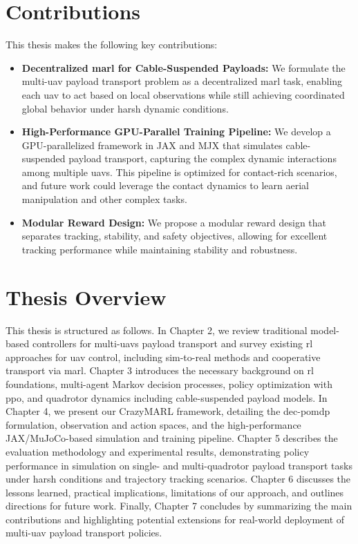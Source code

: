 \section{Contributions}
This thesis makes the following key contributions:
\begin{itemize}
    \item \textbf{Decentralized \gls{marl} for Cable-Suspended Payloads:} We formulate the multi-\gls{uav} payload transport problem as a decentralized \gls{marl} task, enabling each \gls{uav} to act based on local observations while still achieving coordinated global behavior under harsh dynamic conditions.
    \item \textbf{High-Performance GPU-Parallel Training Pipeline:} We develop a GPU-parallelized framework in JAX and MJX that simulates cable-suspended payload transport, capturing the complex dynamic interactions among multiple \glspl{uav}. This pipeline is optimized for contact-rich scenarios, and future work could leverage the contact dynamics to learn aerial manipulation and other complex tasks.
    \item \textbf{Modular Reward Design:} We propose a modular reward design that separates tracking, stability, and safety objectives, allowing for excellent tracking performance while maintaining stability and robustness. 
\end{itemize}

\section{Thesis Overview}
This thesis is structured as follows. In Chapter 2, we review traditional model-based controllers for multi-\glspl{uav} payload transport and survey existing \gls{rl} approaches for \gls{uav} control, including sim-to-real methods and cooperative transport via \gls{marl}. Chapter 3 introduces the necessary background on \gls{rl} foundations, multi-agent Markov decision processes, policy optimization with \gls{ppo}, and quadrotor dynamics including cable-suspended payload models. In Chapter 4, we present our CrazyMARL framework, detailing the \gls{dec-pomdp} formulation, observation and action spaces, and the high-performance JAX/MuJoCo-based simulation and training pipeline. Chapter 5 describes the evaluation methodology and experimental results, demonstrating policy performance in simulation on single- and multi-quadrotor payload transport tasks under harsh conditions and trajectory tracking scenarios. Chapter 6 discusses the lessons learned, practical implications, limitations of our approach, and outlines directions for future work. Finally, Chapter 7 concludes by summarizing the main contributions and highlighting potential extensions for real-world deployment of multi-\gls{uav} payload transport policies.
